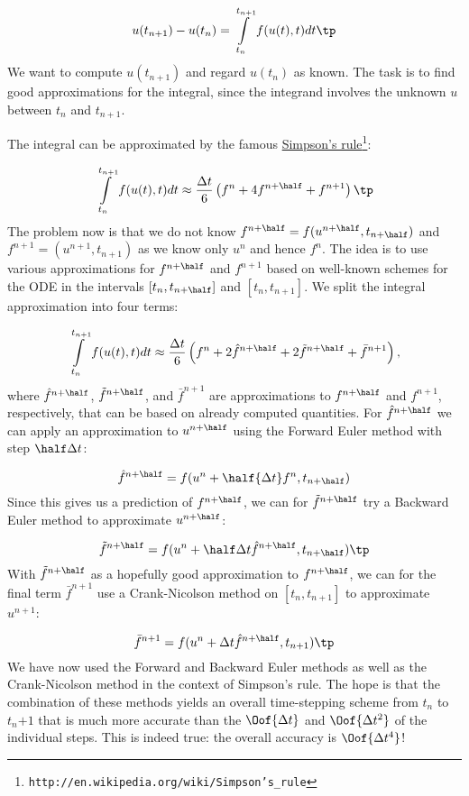 \documentclass[graybox,sectrefs,envcountresetchap,open=right,final]{svmonodo}
\begin{document}
\[ u(t_{n+1}) - u(t_n) = \int\limits_{t_{n}}^{t_{n+1}} f(u(t),t)dt\tp \]
We want to compute $u(t_{n+1})$ and regard $u(t_n)$ as known.
The task is to find good approximations for the integral, since the
integrand involves the unknown $u$ between $t_n$ and $t_{n+1}$.

The integral can be approximated by the famous
\href{{http://en.wikipedia.org/wiki/Simpson's_rule}}{Simpson's rule}\footnote{\texttt{http://en.wikipedia.org/wiki/Simpson's\_rule}}:

\[ \int\limits_{t_{n}}^{t_{n+1}} f(u(t),t)dt
\approx \frac{\Delta t}{6}\left( f^n + 4f^{n+\half} + f^{n+1}\right)\tp\]
The problem now is that we do not know $f^{n+\half}=f(u^{n+\half},t_{n+\half})$
and $f^{n+1}=(u^{n+1},t_{n+1})$ as we know only $u^n$ and hence $f^n$.
The idea is to use various approximations for $f^{n+\half}$ and
$f^{n+1}$ based on well-known schemes for the ODE in the
intervals $[t_n,t_{n+\half}]$ and $[t_n, t_{n+1}]$.
We split the integral approximation into four terms:

\[ \int\limits_{t_{n}}^{t_{n+1}} f(u(t),t)dt
\approx \frac{\Delta t}{6}\left( f^n + 2\hat{f}^{n+\half}
+ 2\tilde{f}^{n+\half} + \bar{f}^{n+1}\right),\]
where $\hat{f}^{n+\half}$, $\tilde{f}^{n+\half}$, and $\bar{f}^{n+1}$
are approximations to $f^{n+\half}$ and
$f^{n+1}$, respectively, that can be based on already computed quantities.
For $\hat{f}^{n+\half}$ we can apply
an approximation to $u^{n+\half}$ using the Forward Euler
method with step $\half\Delta t$:

\begin{equation}
\hat{f}^{n+\half} = f(u^n + \half{\Delta t} f^n, t_{n+\half})
\label{decay:fd2:RK4:hatf}
\end{equation}
Since this gives us a prediction of $f^{n+\half}$, we can for
$\tilde{f}^{n+\half}$ try a Backward Euler method to approximate $u^{n+\half}$:

\begin{equation}
\tilde{f}^{n+\half} = f(u^n + \half\Delta t\hat{f}^{n+\half}, t_{n+\half})\tp
\label{decay:fd2:RK4:tildef}
\end{equation}
With $\tilde{f}^{n+\half}$ as a hopefully good approximation to
$f^{n+\half}$, we can for the final term $\bar{f}^{n+1}$ use
a Crank-Nicolson method on $[t_n, t_{n+1}]$ to approximate $u^{n+1}$:

\begin{equation}
\bar{f}^{n+1} = f(u^n + \Delta t \hat{f}^{n+\half}, t_{n+1})\tp
\label{decay:fd2:RK4:barf}
\end{equation}
We have now used the Forward and Backward Euler methods as well as the
Crank-Nicolson method in the context of Simpson's rule. The hope is
that the combination of these methods yields an overall time-stepping
scheme from $t_n$ to $t_n{+1}$ that is much more accurate than the
$\Oof{\Delta t}$ and $\Oof{\Delta t^2}$ of the individual steps.
This is indeed true: the overall accuracy is $\Oof{\Delta t^4}$!
\end{document}
